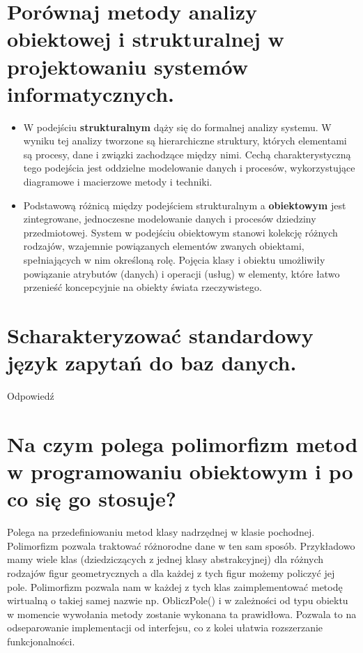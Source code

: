 \documentclass[12pt,a4paper]{article}
\begin{document}
	\section{Porównaj metody analizy obiektowej i strukturalnej w projektowaniu systemów informatycznych.}
	\begin{itemize}
		\item W podejściu \textbf{strukturalnym} dąży się do formalnej analizy systemu. W wyniku tej analizy tworzone są hierarchiczne struktury, których elementami są procesy, dane i związki zachodzące między nimi. Cechą charakterystyczną tego podejścia jest oddzielne modelowanie danych i procesów, wykorzystujące diagramowe i macierzowe metody i techniki.
		\item Podstawową różnicą między podejściem strukturalnym a \textbf{obiektowym} jest zintegrowane, jednoczesne modelowanie danych i procesów dziedziny przedmiotowej. System w podejściu obiektowym stanowi kolekcję różnych rodzajów, wzajemnie powiązanych elementów zwanych obiektami, spełniających w nim określoną rolę. Pojęcia klasy i obiektu umożliwiły powiązanie atrybutów (danych) i operacji (usług) w elementy, które łatwo przenieść koncepcyjnie na obiekty świata rzeczywistego.
	\end{itemize}

	\section{Scharakteryzować standardowy język zapytań do baz danych.}
	Odpowiedź

	\section{Na czym polega polimorfizm metod w programowaniu obiektowym i po co się go stosuje?}
	Polega na przedefiniowaniu metod klasy nadrzędnej w klasie pochodnej. Polimorfizm pozwala traktować różnorodne dane w ten sam sposób. Przykładowo mamy wiele klas (dziedziczących z jednej klasy abstrakcyjnej) dla różnych rodzajów figur geometrycznych a dla każdej z tych figur możemy policzyć jej pole. Polimorfizm pozwala nam w każdej z tych klas zaimplementować metodę wirtualną o takiej samej nazwie np. ObliczPole() i w zależności od typu obiektu w momencie wywołania metody zostanie wykonana ta prawidłowa. Pozwala to na odseparowanie implementacji od interfejsu, co z kolei ułatwia rozszerzanie funkcjonalności.
\end{document}
